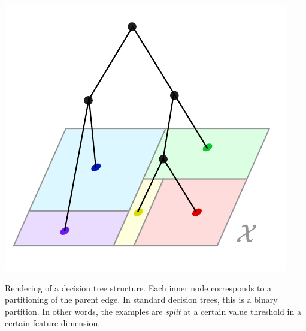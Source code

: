 \documentclass[../main.tex]{subfiles}
\begin{document}

\begin{marginfigure}
    \label{fig:decision-tree-partition}
    \includegraphics[width=\textwidth]{figma-illustrations/decision-tree}
    \caption{
        Rendering of a decision tree structure. Each inner node corresponds to a partitioning of the parent edge. In standard decision trees, this is a binary partition. In other words, the examples are \textit{split} at a certain value threshold in a certain feature dimension.    }
\end{marginfigure}
\end{document}
